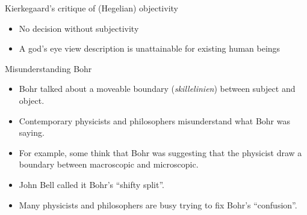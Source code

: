 \documentclass[ignorenonframetext, ]{beamer}
\begin{document}
\begin{frame}{Kierkegaard's critique of (Hegelian) objectivity}

\begin{itemize}
\item No decision without subjectivity
\item A god's eye view description is unattainable for existing human
  beings
\end{itemize}
\end{frame}


\begin{frame}{Misunderstanding Bohr}

  \begin{itemize}
  \item Bohr talked about a moveable boundary (\emph{skillelinien})
    between subject and object.
  \item Contemporary physicists and philosophers misunderstand what
    Bohr was saying.
  \item For example, some think that Bohr was suggesting that the
    physicist draw a boundary between macroscopic and microscopic.
  \item John Bell called it Bohr's ``shifty split''.
  \item Many physicists and philosophers are busy trying to fix Bohr's
    ``confusion''.
  \end{itemize}


\end{frame}
\end{document}
